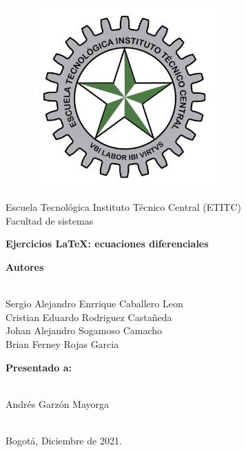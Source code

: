 \documentclass[a4paper,11pt,openany]{book}
\begin{document}
\begin{titlepage}
 
\begin{center}
\vspace*{-1in}
\begin{figure}[htb]
\begin{center}
\includegraphics[width=7cm]{ETITC.png}
\end{center}
\end{figure}
 
 
{\sc \huge Escuela Tecnológica Instituto Técnico Central (ETITC)}\\
\vspace*{0.15in}
Facultad de sistemas\\
\vspace*{0.6in}
\begin{Large}
\textbf{Ejercicios {\LaTeX}: ecuaciones diferenciales} \\
\end{Large}
\vspace*{0.3in}
\begin{large}
{\bf Autores} \\
 
\ 
 
Sergio Alejandro Enrrique Caballero Leon\\ 
Cristian Eduardo Rodriguez Castañeda \\ 
Johan Alejandro Sogamoso Camacho \\ 
Brian Ferney Rojas Garcia
\end{large}
\vspace*{0.3in}
 
\end{center}
 
\begin{center}
{\bf Presentado a:} \\
 
\ 
 
Andrés Garzón Mayorga \\
 
\
 
Bogot{\'a}, Diciembre de 2021.
\end{center}
 
\end{titlepage}
 
\end{document}

